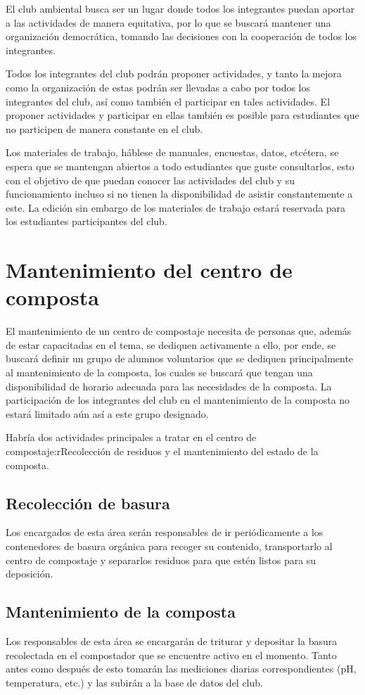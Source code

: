 
El club ambiental busca ser un lugar donde todos los integrantes puedan aportar a las actividades de manera equitativa, por lo que se buscará mantener una organización democrática, tomando las decisiones con la cooperación de todos los integrantes.

Todos los integrantes del club podrán proponer actividades, y tanto la mejora como la organización de estas podrán ser llevadas a cabo por todos los integrantes del club, así como también el participar en tales actividades. El proponer actividades y participar en ellas también es posible para estudiantes que no participen de manera constante en el club.

Los materiales de trabajo, háblese de manuales, encuestas, datos, etcétera, se espera que se mantengan abiertos a todo estudiantes que guste consultarlos, esto con el objetivo de que puedan conocer las actividades del club y su funcionamiento incluso si no tienen la disponibilidad de asistir constantemente a este. La edición sin embargo de los materiales de trabajo estará reservada para los estudiantes participantes del club.

\section{Mantenimiento del centro de composta}

El mantenimiento de un centro de compostaje necesita de personas que, además de estar capacitadas en el tema, se dediquen activamente a ello, por ende, se buscará definir un grupo de alumnos voluntarios que se dediquen principalmente al mantenimiento de la composta, los cuales se buscará que tengan una disponibilidad de horario adecuada para las necesidades de la composta. La participación de los integrantes del club en el mantenimiento de la composta no estará limitado aún así a este grupo designado.

Habría dos actividades principales a tratar en el centro de compostaje:rRecolección de residuos y el mantenimiento del estado de la composta.

\subsection{Recolección de basura}

Los encargados de esta área serán responsables de ir periódicamente a los contenedores de basura orgánica para recoger su contenido, transportarlo al centro de compostaje y separarlos residuos para que estén listos para su deposición.

\subsection{Mantenimiento de la composta}

Los responsables de esta área se encargarán de triturar y depositar la basura recolectada en el compostador que se encuentre activo en el momento. Tanto antes como después de esto tomarán las mediciones diarias correspondientes (pH, temperatura, etc.) y las subirán a la base de datos del club.
